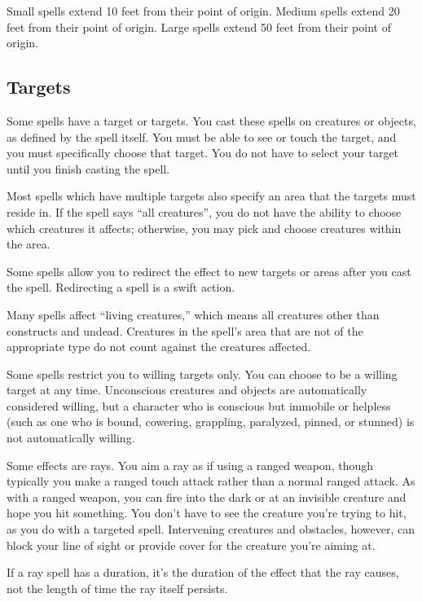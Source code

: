  Small spells extend 10 feet from their point of origin.
 Medium spells extend 20 feet from their point of origin.
 Large spells extend 50 feet from their point of origin.

\subsection{Targets}
Some spells have a target or targets. You cast these spells on creatures or objects, as defined by the spell itself. You must be able to see or touch the target, and you must specifically choose that target. You do not have to select your target until you finish casting the spell.

 Most spells which have multiple targets also specify an area that the targets must reside in. If the spell says ``all creatures'', you do not have the ability to choose which creatures it affects; otherwise, you may pick and choose creatures within the area.

 Some spells allow you to redirect the effect to new targets or areas after you cast the spell. Redirecting a spell is a swift action.

 Many spells affect ``living creatures,'' which means all creatures other than constructs and undead. Creatures in the spell's area that are not of the appropriate type do not count against the creatures affected.

 Some spells restrict you to willing targets only. You can choose to be a willing target at any time. Unconscious creatures and objects are automatically considered willing, but a character who is conscious but immobile or helpless (such as one who is bound, cowering, grappling, paralyzed, pinned, or stunned) is not automatically willing.

 Some effects are rays. You aim a ray as if using a ranged weapon, though typically you make a ranged touch attack rather than a normal ranged attack. As with a ranged weapon, you can fire into the dark or at an invisible creature and hope you hit something. You don't have to see the creature you're trying to hit, as you do with a targeted spell. Intervening creatures and obstacles, however, can block your line of sight or provide cover for the creature you're aiming at.

If a ray spell has a duration, it's the duration of the effect that the ray causes, not the length of time the ray itself persists.

